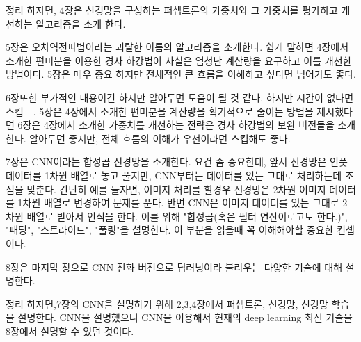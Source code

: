 	정리 하자면, 4장은 신경망을 구성하는 퍼셉트론의 가중치와 그 가중치를 평가하고 개선하는 알고리즘을 소개 한다.
	
	5장은 오차역전파법이라는 괴랄한 이름의 알고리즘을 소개한다. 쉽게 말하면 4장에서 소개한 편미분을 이용한 경사 하강법이 사실은 엄청난 계산량을 요구하고 이를 개선한 방법이다. 5장은 매우 중요 하지만 전체적인 큰 흐름을 이해하고 싶다면 넘어가도 좋다.
	
	6장또한 부가적인 내용이긴 하지만 알아두면 도움이 될 것 같다. 하지만 시간이 없다면 스킵~~. 5장은 4장에서 소개한 편미분을 계산량을 획기적으로 줄이는 방법을 제시했다면 6장은 4장에서 소개한 가중치를 개선하는 전략은 경사 하강법의 보완 버전들을 소개한다. 알아두면 좋지만, 전체 흐름의 이해가 우선이라면 스킵해도 좋다.
	
	7장은 CNN이라는 합성곱 신경망을 소개한다. 요건 좀 중요한데, 앞서 신경망은 인풋 데이터를 1차원 배열로 놓고 풀지만, CNN부터는 데이터를 있는 그대로 처리하는데 초점을 맞춘다. 간단히 예를 들자면, 이미지 처리를 할경우 신경망은 2차원 이미지 데이터를 1차원 배열로 변경하여 문제를 푼다. 반면 CNN은 이미지 데이터를 있는 그대로 2차원 배열로 받아서 인식을 한다. 이를 위해 "합성곱(혹은 필터 연산이로고도 한다.)", "패딩", "스트라이드", "풀링"을 설명한다. 이 부분을 읽을때 꼭 이해해야할 중요한 컨셉이다.
	
	8장은 마지막 장으로 CNN 진화 버전으로 딥러닝이라 불리우는 다양한 기술에 대해 설명한다.
	
	정리 하자면,7장의 CNN을 설명하기 위해 2,3,4장에서 퍼셉트론, 신경망, 신경망 학습을 설명한다. CNN을 설명했으니 CNN을 이용해서 현재의 deep learning 최신 기술을 8장에서 설명할 수 있던 것이다.